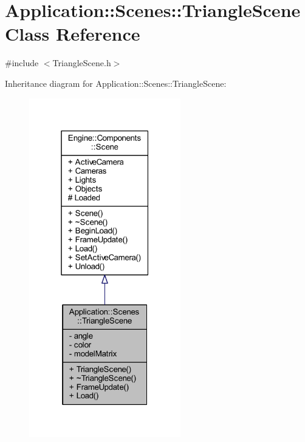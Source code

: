 \hypertarget{classApplication_1_1Scenes_1_1TriangleScene}{}\section{Application\+:\+:Scenes\+:\+:Triangle\+Scene Class Reference}
\label{classApplication_1_1Scenes_1_1TriangleScene}


{\ttfamily \#include $<$Triangle\+Scene.\+h$>$}



Inheritance diagram for Application\+:\+:Scenes\+:\+:Triangle\+Scene\+:
\nopagebreak
\begin{figure}[H]
\begin{center}
\leavevmode
\includegraphics[width=187pt]{classApplication_1_1Scenes_1_1TriangleScene__inherit__graph}
\end{center}
\end{figure}


